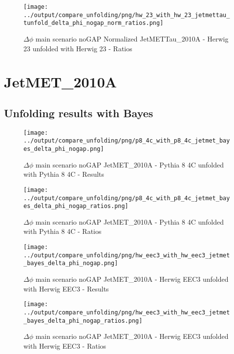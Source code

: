 \documentclass[11pt]{book}
\begin{document}
\begin{figure}[ht]
\centering
\texttt{[image: ../output/compare\_unfolding/png/hw\_23\_with\_hw\_23\_jetmettau\_tunfold\_delta\_phi\_nogap\_norm\_ratios.png]}
\caption{$\Delta\phi$ main scenario noGAP Normalized JetMETTau\_2010A - Herwig 23 unfolded with Herwig 23 - Ratios}
\label{hw_23_hw_23_jetmettau_tunfold_delta_phi_nogap_norm_b}
\end{figure}




\clearpage
\section{JetMET\_2010A}
\subsection{Unfolding results with Bayes}

\begin{figure}[ht]
\centering
\texttt{[image: ../output/compare\_unfolding/png/p8\_4c\_with\_p8\_4c\_jetmet\_bayes\_delta\_phi\_nogap.png]}
\caption{$\Delta\phi$ main scenario noGAP JetMET\_2010A - Pythia 8 4C unfolded with Pythia 8 4C - Results}
\label{p8_p8_jetmet_bayes_delta_phi_nogap_a}
\end{figure}

\begin{figure}[ht]
\centering
\texttt{[image: ../output/compare\_unfolding/png/p8\_4c\_with\_p8\_4c\_jetmet\_bayes\_delta\_phi\_nogap\_ratios.png]}
\caption{$\Delta\phi$ main scenario noGAP JetMET\_2010A - Pythia 8 4C unfolded with Pythia 8 4C - Ratios}
\label{p8_p8_jetmet_bayes_delta_phi_nogap_b}
\end{figure}

\begin{figure}[ht]
\centering
\texttt{[image: ../output/compare\_unfolding/png/hw\_eec3\_with\_hw\_eec3\_jetmet\_bayes\_delta\_phi\_nogap.png]}
\caption{$\Delta\phi$ main scenario noGAP JetMET\_2010A - Herwig EEC3 unfolded with Herwig EEC3 - Results}
\label{hw_eec3_hw_eec3_jetmet_bayes_delta_phi_nogap_a}
\end{figure}

\begin{figure}[ht]
\centering
\texttt{[image: ../output/compare\_unfolding/png/hw\_eec3\_with\_hw\_eec3\_jetmet\_bayes\_delta\_phi\_nogap\_ratios.png]}
\caption{$\Delta\phi$ main scenario noGAP JetMET\_2010A - Herwig EEC3 unfolded with Herwig EEC3 - Ratios}
\label{hw_eec3_hw_eec3_jetmet_bayes_delta_phi_nogap_b}
\end{figure}
\end{document}
